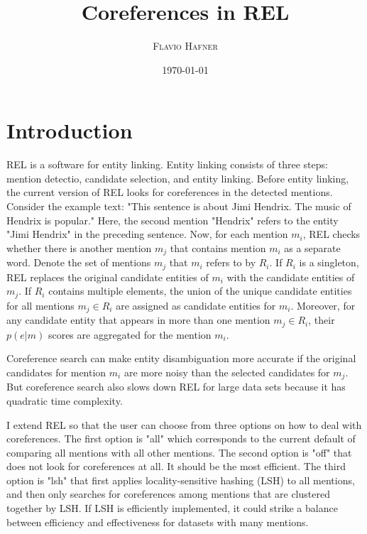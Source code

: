 \documentclass[a4paper,11pt]{article}
\numberwithin{equation}{section} %
\begin{document}
\title{Coreferences in REL
}



\author{\textsc{Flavio Hafner}
}

\date{\today}


\clearpage
\maketitle

\tableofcontents



\section{Introduction}

REL is a software for entity linking. Entity linking consists of three steps: mention detectio, candidate selection, and entity linking. Before entity linking, the current version of REL looks for coreferences in the detected mentions. Consider the example text: "This sentence is about Jimi Hendrix. The music of Hendrix is popular." Here, the second mention "Hendrix" refers to the entity "Jimi Hendrix" in the preceding sentence. Now, for each mention $m_i$, REL checks whether there is another mention $m_j$ that contains mention $m_i$ as a separate word. Denote the set of mentions $m_j$ that $m_i$ refers to by $R_i$.
If $R_i$ is a singleton, REL replaces the original candidate entities of $m_i$ with the candidate entities of $m_j$.
If $R_i$ contains multiple elements, the union of the unique candidate entities for all mentions  $m_j \in R_i$ are assigned as candidate entities for $m_i$. Moreover, for any candidate entity that appears in more than one mention $m_j \in R_i$, their $p(e|m)$ scores are aggregated for the mention $m_i$.

Coreference search can make entity disambiguation more accurate if the original candidates for mention $m_i$ are more noisy than the selected candidates for $m_j$. 
But coreference search also slows down REL for large data sets because it has quadratic time complexity.

I extend REL so that the user can choose from three options on how to deal with coreferences. The first option is "all" which corresponds to the current default of comparing all mentions with all other mentions. The second option is "off" that does not look for coreferences at all. It should be the most efficient. The third option is "lsh" that first applies locality-sensitive hashing (LSH) to all mentions, and then only searches for coreferences among mentions that are clustered together by LSH. If LSH is efficiently implemented, it could strike a balance between efficiency and effectiveness for datasets with many mentions. 
\end{document}
